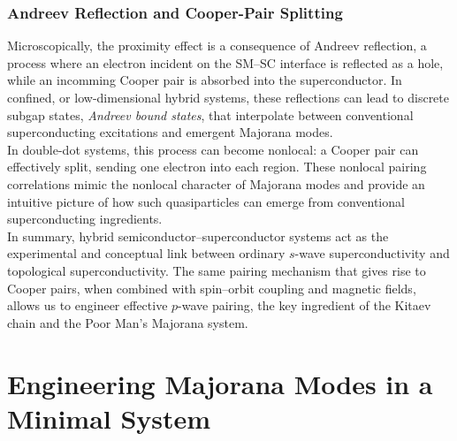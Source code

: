 \documentclass[11pt, letterpaper, titlepage]{article}
\begin{document}
\subsubsection{Andreev Reflection and Cooper-Pair Splitting}
Microscopically, the proximity effect is a consequence of Andreev reflection, a process where an electron incident on the SM–SC interface is reflected as a hole, while an incomming Cooper pair is absorbed into the superconductor. In confined, or low-dimensional hybrid systems, these reflections can lead to discrete subgap states, \textit{Andreev bound states}, that interpolate between conventional superconducting excitations and emergent Majorana modes.\\
In double-dot systems, this process can become nonlocal: a Cooper pair can effectively split, sending one electron into each region. These nonlocal pairing correlations mimic the nonlocal character of Majorana modes and provide an intuitive picture of how such quasiparticles can emerge from conventional superconducting ingredients.\\
In summary, hybrid semiconductor–superconductor systems act as the experimental and conceptual link between ordinary $s$-wave superconductivity and topological superconductivity. The same pairing mechanism that gives rise to Cooper pairs, when combined with spin–orbit coupling and magnetic fields, allows us to engineer effective $p$-wave pairing, the key ingredient of the Kitaev chain and the Poor Man’s Majorana system.
























\section{Engineering Majorana Modes in a Minimal System}
\end{document}
